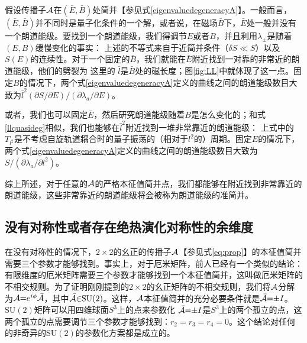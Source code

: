 假设传播子${\cal A}$在$(\bar{E},\bar{B})$处简并【参见式\ref{eigenvaluedegeneracyA}】。一般而言，$(\bar{E},\bar{B})$并不同时是量子化条件的一个解，或者说，在磁场$\bar{B}$下，$\bar{E}$处一般并没有一个朗道能级。要找到一个朗道能级，我们得调节$E$或者$B$，并且利用$\lambda_{\pm}$是随着$(E,B)$缓慢变化的事实：
上述的不等式来自于近简并条件（$\delta S{\ll}S$）以及$S(E)$的连续性。对于一个固定的$\bar{B}$，我们就能在$\bar{E}$附近找到一对靠的非常近的朗道能级，他们的劈裂为
这里的 $\bar{l}$是$\bar{B}$处的磁长度；图\ref{fig:LL}中就体现了这一点。固定$B$的情况下，两个式\ref{eigenvaluedegeneracyA}定义的曲线之间的朗道能级数目大致为$\bar{l}^2(\partial S/\partial E)/(\partial \lambda_a/\partial E)$。

或者，我们也可以固定$\bar{E}$，然后研究朗道能级随着$B$是怎么变化的；和式\ref{llquasideg}相似，我们也能够在$\bar{l}^2$附近找到一堆非常靠近的朗道能级：
上式中的$T_{l^2}$是不考虑自旋轨道耦合时的量子振荡的（相对于$l^2$的）周期。固定$E$的情况下，两个式\ref{eigenvaluedegeneracyA}定义的曲线之间的朗道能级数目大致为$S/(\partial \lambda_a/\partial l^2)$。


综上所述，对于任意的${\cal A}$的严格本征值简并点，我们都能够在附近找到非常靠近的朗道能级，这些非常靠近的朗道能级将会被称为朗道能级的准简并。


\subsection{没有对称性或者存在绝热演化对称性的余维度}\label{sec:introducecodimension}

在没有对称性的情况下，$2\times 2$的幺正的传播子${\cal A}$【参见式\ref{eq:prop}】的本征值简并需要三个参数才能够找到。事实上，对于厄米矩阵，前人已经有一个类似的结论：有限维度的厄米矩阵需要三个参数才能够找到一个本征值简并\cite{neumann2000behaviour}，这叫做厄米矩阵的不相交规则。为了证明刚刚提到的$2\times 2$的幺正矩阵的不相交规则，我们将${\cal A}$分解为${\cal A}{=}e^{i\phi}{\cal \bar{A}}$，其中${\cal \bar{A}}{\in}\text{SU}(2)$。这样，${\cal A}$本征值简并的充分必要条件就是${\cal \bar{A}}{=}{\pm}I$。$\text{SU}(2)$矩阵可以用四维球面$S^3$上的点来参数化 
${\cal\bar{A}}{=}{\pm}I$是$S^3$上的两个孤立的点，这两个孤立的点需要调节三个参数才能够找到：$r_2{=}r_3{=}r_4{=}0$。这个结论对任何的非奇异的SU$(2)$的参数化方案都是成立的。


